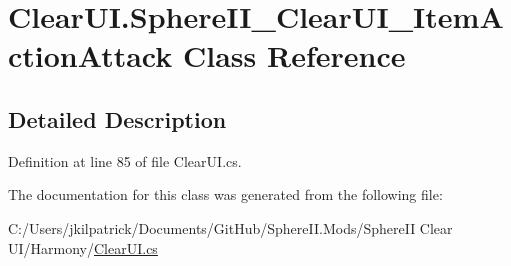 \hypertarget{class_clear_u_i_1_1_sphere_i_i___clear_u_i___item_action_attack}{}\section{Clear\+U\+I.\+Sphere\+I\+I\+\_\+\+Clear\+U\+I\+\_\+\+Item\+Action\+Attack Class Reference}
\label{class_clear_u_i_1_1_sphere_i_i___clear_u_i___item_action_attack}


\subsection{Detailed Description}


Definition at line 85 of file Clear\+U\+I.\+cs.



The documentation for this class was generated from the following file\+:\begin{DoxyCompactItemize}
\item 
C\+:/\+Users/jkilpatrick/\+Documents/\+Git\+Hub/\+Sphere\+I\+I.\+Mods/\+Sphere\+I\+I Clear U\+I/\+Harmony/\mbox{\hyperlink{_clear_u_i_8cs}{Clear\+U\+I.\+cs}}\end{DoxyCompactItemize}
